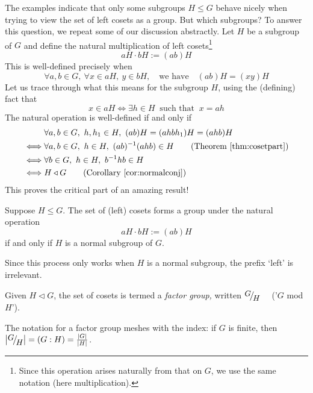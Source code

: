 
The examples indicate that only some subgroups $H\le G$ behave nicely when trying to view the set of left cosets as a group. But which subgroups? To answer this question, we repeat some of our discussion abstractly. Let $H$ be a subgroup of $G$ and define the natural multiplication of left cosets\footnote{Since this operation arises naturally from that on $G$, we use the same notation (here multiplication).}
\[
	aH\cdot bH:=(ab)H
\]
This is well-defined precisely when
\[
	\forall a,b\in G,\ \forall x\in aH,\ y\in bH,
	\quad \text{we have}\quad 
	(ab)H=(xy)H
\]
Let us trace through what this means for the subgroup $H$, using the (defining) fact that 
\[
	x\in aH\iff \exists h\in H\ \text{ such that }\  x=ah
\]
The natural operation is well-defined if and only if
\begin{align*}
	&\forall a,b\in G,\ h,h_1\in H,\ (ab)H=(ahbh_1)H=(ah b)H\\
	\iff &\forall a,b\in G,\ h\in H,\ (ab)^{-1}(ah b)\in H \tag{Theorem \ref{thm:cosetpart}}\\
	\iff &\forall b\in G,\ h\in H,\ b^{-1}hb\in H\\
	\iff&H\triangleleft G \tag{Corollary \ref{cor:normalconj}}
\end{align*}
This proves the critical part of an amazing result!

\begin{thm}{}{}
	Suppose $H\le G$. The set of (left) cosets forms a group under the natural operation
	\[
		aH\cdot bH:=(ab)H \tag{$\ast$}
	\]
	if and only if $H$ is a normal subgroup of $G$.
\end{thm}

Since this process only works when $H$ is a normal subgroup, the prefix `left' is irrelevant.

\begin{defn}{}{}
	Given $H\triangleleft G$, the set of cosets is termed a \emph{factor group,} written $\quotient GH$ \ \ ('$G$ mod $H$').
\end{defn}

The notation for a factor group meshes with the index: if $G$ is finite, then $\nm{\quotient GH}=(G:H)=\frac{\nm G}{\nm H}$.


